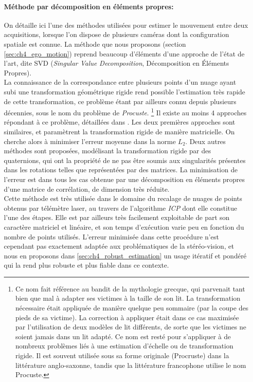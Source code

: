 \paragraph{Méthode par décomposition en éléments propres:\\} \label{sec:ch4_estimation_transformation_rigide}
On détaille ici l'une des méthodes utilisées pour estimer le mouvement entre deux acquisitions, lorsque l'on dispose de plusieurs caméras dont la configuration spatiale est connue. La méthode que nous proposons (section \ref{sec:ch4_ego_motion}) reprend beaucoup d'éléments d'une approche de l'état de l'art, dite \og SVD\fg{} (\emph{Singular Value Decomposition}, Décomposition en Éléments Propres).\\

La connaissance de la correspondance entre plusieurs points d'un nuage ayant subi une transformation géométrique rigide rend possible l'estimation très rapide de cette transformation, ce problème étant par ailleurs connu depuis plusieurs décennies, sous le nom du problème de \emph{Procuste}. \footnote{Ce nom fait référence au bandit de la mythologie grecque, qui parvenait tant bien que mal à adapter ses victimes à la taille de son lit. La transformation nécessaire était appliquée de manière quelque peu sommaire (par la coupe des pieds de sa victime). La correction à appliquer était dans ce cas maximisée par l'utilisation de deux modèles de lit différents, de sorte que les victimes ne soient jamais dans un lit adapté. Ce nom est resté pour s'appliquer à de nombreux problèmes liés à une estimation d'échelle ou de transformation rigide. Il est souvent utilisée sous sa forme originale (Procruste) dans la littérature anglo-saxonne, tandis que la littérature francophone utilise le nom Procuste.} Il existe au moins 4 approches répondant à ce problème, détaillées dans \cite{Eggert1997}. Les deux premières approches sont similaires, et paramètrent la transformation rigide de manière matricielle. On cherche alors à minimiser l'erreur moyenne dans la norme $L_2$. Deux autres méthodes sont proposées, modélisant la transformation rigide par des quaternions, qui ont la propriété de ne pas être soumis aux singularités présentes dans les rotations telles que représentées par des matrices. La minimisation de l'erreur est dans tous les cas obtenue par une décomposition en éléments propres d'une matrice de corrélation, de dimension très réduite. \\

Cette méthode est très utilisée dans le domaine du recalage de nuages de points obtenus par télémètre laser, au travers de l'algorithme \emph{ICP} dont elle constitue l'une des étapes. Elle est par ailleurs très facilement exploitable de part son caractère matriciel et linéaire, et son temps d'exécution varie peu en fonction du nombre de points utilisés. L'erreur minimisée dans cette procédure n'est cependant pas exactement adaptée aux problématiques de la stéréo-vision, et nous en proposons dans \ref{sec:ch4_robust_estimation} un usage itératif et pondéré qui la rend plus robuste et plus fiable dans ce contexte. \\


